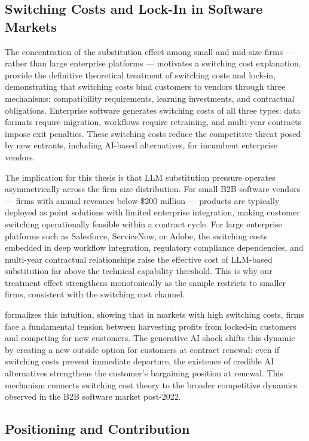 \documentclass[12pt,a4paper]{article}
\begin{document}
\subsection{Switching Costs and Lock-In in Software Markets}

The concentration of the substitution effect among small and mid-size firms --- rather than large enterprise platforms --- motivates a switching cost explanation. \citet{farrell2007} provide the definitive theoretical treatment of switching costs and lock-in, demonstrating that switching costs bind customers to vendors through three mechanisms: compatibility requirements, learning investments, and contractual obligations. Enterprise software generates switching costs of all three types: data formats require migration, workflows require retraining, and multi-year contracts impose exit penalties. These switching costs reduce the competitive threat posed by new entrants, including AI-based alternatives, for incumbent enterprise vendors.

The implication for this thesis is that LLM substitution pressure operates asymmetrically across the firm size distribution. For small B2B software vendors --- firms with annual revenues below \$200 million --- products are typically deployed as point solutions with limited enterprise integration, making customer switching operationally feasible within a contract cycle. For large enterprise platforms such as Salesforce, ServiceNow, or Adobe, the switching costs embedded in deep workflow integration, regulatory compliance dependencies, and multi-year contractual relationships raise the effective cost of LLM-based substitution far above the technical capability threshold. This is why our treatment effect strengthens monotonically as the sample restricts to smaller firms, consistent with the switching cost channel.

\citet{klemperer1995} formalizes this intuition, showing that in markets with high switching costs, firms face a fundamental tension between harvesting profits from locked-in customers and competing for new customers. The generative AI shock shifts this dynamic by creating a new outside option for customers at contract renewal: even if switching costs prevent immediate departure, the existence of credible AI alternatives strengthens the customer's bargaining position at renewal. This mechanism connects switching cost theory to the broader competitive dynamics observed in the B2B software market post-2022.

\subsection{Positioning and Contribution}
\end{document}
